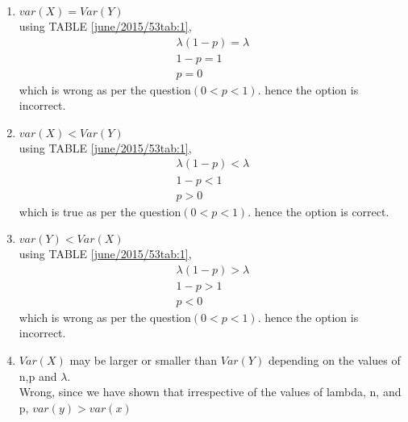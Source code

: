 \begin{enumerate}
    \item $var(X)=Var(Y)$\\
          using TABLE \ref{june/2015/53tab:1},
          \begin{align}
          \lambda(1-p) = \lambda\\
          1-p=1\\
          p=0
          \end{align}
          which is wrong as per the question$(0<p<1)$.
          hence the option is incorrect.
    \item $var(X)<Var(Y)$\\
          using TABLE \ref{june/2015/53tab:1},
          \begin{align}
          \lambda(1-p) < \lambda\\
          1-p<1\\
          p>0
          \end{align}
          which is true as per the question$(0<p<1)$.
          hence the option is correct.
    \item $var(Y)<Var(X)$\\
     using TABLE \ref{june/2015/53tab:1},
          \begin{align}
          \lambda(1-p) > \lambda\\
          1-p>1\\
          p<0
          \end{align}
          which is wrong as per the question$(0<p<1)$.
          hence the option is incorrect.
    \item $Var(X)$ may be larger or smaller than $Var(Y)$ depending on the values of n,p and $\lambda$.\\
    Wrong, since we have shown that irrespective of the values of lambda, n, and p, $var(y) > var(x)$
\end{enumerate}
